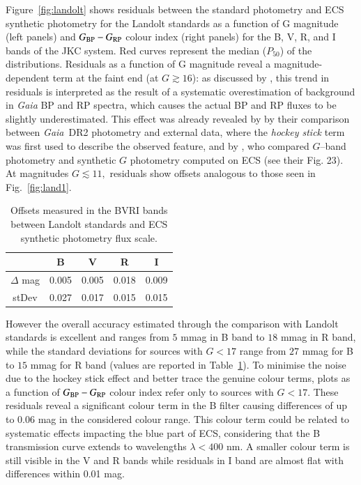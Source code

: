 \documentclass{aa}
\newcommand{\gdr}[1]{\gaia~DR#1\xspace}
\newcommand{\gaia}{\textit{Gaia}\xspace}
\newcommand{\gband}{$G$--band\xspace}
\newcommand{\bprp}{\ensuremath{G_{\rm BP}-G_{\rm RP}}\xspace}
\newcommand{\xp}{BP and RP\xspace}
\newcommand{\figref}[1]{Fig.~\ref{fig:#1}}
\newcommand{\afigref}[1]{Figure~\ref{fig:#1}}
\newcommand{\tabref}[1]{Table~\ref{tab:#1}}
\begin{document}
\afigref{landolt} shows residuals between the standard photometry and ECS synthetic photometry for the Landolt standards as a function of G magnitude (left panels) and \bprp colour index (right panels) for the B, V, R, and I bands of the JKC system.
Red curves represent the median ($P_{50}$) of the distributions. Residuals as a function of G magnitude reveal a magnitude-dependent term at the faint end (at $G\gtrsim16$): as discussed by \citet{Montegriffo2022}, this trend in residuals is interpreted as the result of a systematic overestimation of background in \gaia \xp spectra, which causes the actual \xp fluxes to be slightly underestimated. This effect was already revealed by \citet{Evans2018} by their comparison between \gdr 2 photometry and external data, where the \emph{hockey stick} term was first used to describe the observed feature, and by  \citet{Riello2021}, who compared \gband photometry and synthetic $G$ photometry computed on ECS (see their Fig. 23).
At magnitudes $G\lesssim11,$ residuals show offsets analogous to those seen in \figref{land1}. 
\begin{table}
\begin{center}
\caption{Offsets measured in the BVRI bands between Landolt standards and ECS synthetic photometry flux scale.}
\label{tab:offset}
\begin{tabular}{c|c|c|c|c}
\hline
 & B & V & R & I\\
\hline
$\Delta$ mag & 0.005 & 0.005 & 0.018 & 0.009\\
     stDev & 0.027 & 0.017 & 0.015 & 0.015\\
\hline
\end{tabular} 
\end{center}
\end{table}
However the overall accuracy estimated through the comparison with Landolt standards is excellent and ranges from $5$ mmag in B band to $18$ mmag in R band, while the standard deviations for sources with $G<17$ range from $27$ mmag for B to $15$ mmag for R band (values are reported in \tabref{offset}).
To minimise the noise due to the hockey stick effect and better trace the genuine colour terms, plots as a function of \bprp colour index refer only to sources with $G<17$.
These residuals reveal a significant colour term in the B filter causing differences of up to $0.06$ mag in the considered colour range. This colour term could be related to systematic effects impacting the blue part of ECS, considering that the B transmission curve extends to wavelengths $\lambda < 400$ nm. A smaller colour term is still visible in the V and R bands while residuals in I band are almost flat with differences within 0.01 mag.
\end{document}

